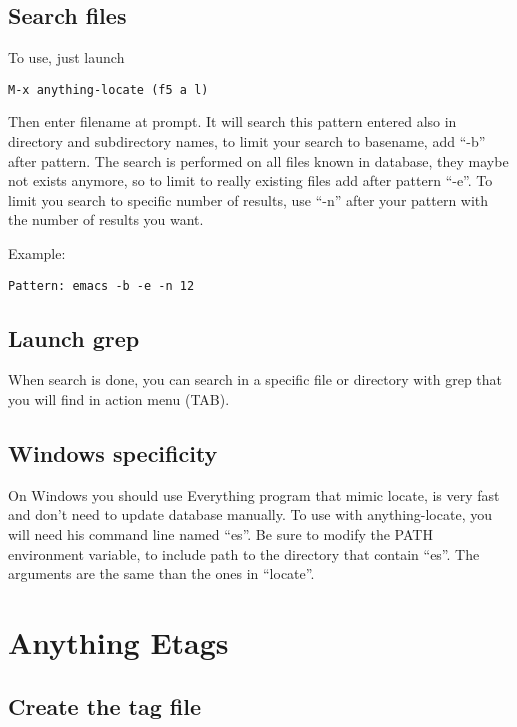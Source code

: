 \documentclass[a4paper,11pt]{article}
\begin{document}
\subsection{Search files}
\label{sec:search-files}

To use, just launch 
\begin{verbatim}
M-x anything-locate (f5 a l)
\end{verbatim}

Then enter filename at prompt.
It will search this pattern entered also in directory and subdirectory names, to limit your search to basename,
add ``-b'' after pattern.
The search is performed on all files known in database, they maybe not exists anymore, so to limit to
really existing files add after pattern ``-e''.
To limit you search to specific number of results, use ``-n'' after your pattern with the number of results
you want.

Example:
\begin{verbatim}
Pattern: emacs -b -e -n 12
\end{verbatim}

\subsection{Launch grep}
\label{sec:launch-grep}

When search is done, you can search in a specific file or directory with grep that you will find in action menu (TAB).

\subsection{Windows specificity}
\label{sec:windows-specificity}

On Windows you should use Everything program that mimic locate, is very fast and don't need to
update database manually.
To use with anything-locate, you will need his command line named ``es''.
Be sure to modify the PATH environment variable, to include path to the directory that contain ``es''.
The arguments are the same than the ones in ``locate''.

\section{Anything Etags}
\label{sec:anything-etags}

\subsection{Create the tag file}
\label{sec:create-tag-file}
\end{document}
